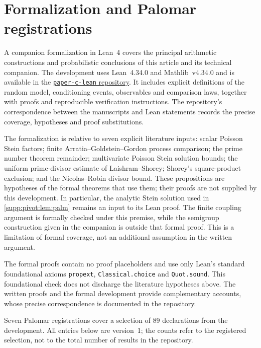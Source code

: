 \section*{Formalization and Palomar registrations}
\label{sec:formalization}
A companion formalization in Lean~4 covers the principal arithmetic constructions
and probabilistic conclusions of this article and its technical companion.
The development uses Lean~4.34.0 and Mathlib~v4.34.0 and is available in the
\href{https://github.com/Vulkin-prog/paper-c-lean}{\texttt{paper-c-lean} repository}.
It includes explicit definitions of the random model, conditioning events,
observables and comparison laws, together with proofs and reproducible verification
instructions. The repository's correspondence between the manuscripts and Lean
statements records the precise coverage, hypotheses and proof substitutions.

The formalization is relative to seven explicit literature inputs: scalar Poisson
Stein factors; finite Arratia--Goldstein--Gordon process comparison; the prime
number theorem remainder; multivariate Poisson Stein solution bounds; the uniform
prime-divisor estimate of Laishram--Shorey; Shorey's square-product exclusion; and
the Nicolas--Robin divisor bound. These propositions are hypotheses of the formal
theorems that use them; their proofs are not supplied by this development. In
particular, the analytic Stein solution used in \cref{supp:pivot:lem:palm} remains
an input to its Lean proof. The finite coupling argument is formally checked
under this premise, while the semigroup construction given in the companion is
outside that formal proof. This is a limitation of formal coverage, not an
additional assumption in the written argument.

The formal proofs contain no proof placeholders and use only Lean's standard
foundational axioms \texttt{propext}, \texttt{Classical.choice} and
\texttt{Quot.sound}. This foundational check does not discharge the literature
hypotheses above. The written proofs and the formal development provide
complementary accounts, whose precise correspondence is documented in the
repository.

Seven Palomar registrations cover a selection of 89 declarations from the
development. All entries below are version~1; the counts refer to the registered
selection, not to the total number of results in the repository.

